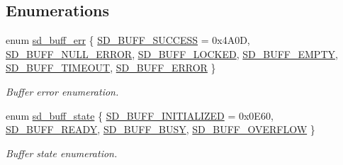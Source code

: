 \subsection*{Enumerations}
\begin{DoxyCompactItemize}
\item 
enum \mbox{\hyperlink{group___s_d___buffer___types_ga012d8a07d989f00e3f9c4a2f62743de4}{sd\+\_\+buff\+\_\+err}} \{ \newline
\mbox{\hyperlink{group___s_d___buffer___types_gga012d8a07d989f00e3f9c4a2f62743de4a57815778d30aaa889a6e73dfc081e5f6}{S\+D\+\_\+\+B\+U\+F\+F\+\_\+\+S\+U\+C\+C\+E\+SS}} = 0x4\+A0D, 
\mbox{\hyperlink{group___s_d___buffer___types_gga012d8a07d989f00e3f9c4a2f62743de4a4fbcad5e560902c4b01a8cdad1af037f}{S\+D\+\_\+\+B\+U\+F\+F\+\_\+\+N\+U\+L\+L\+\_\+\+E\+R\+R\+OR}}, 
\mbox{\hyperlink{group___s_d___buffer___types_gga012d8a07d989f00e3f9c4a2f62743de4a18c0d6717027d1d8219aa76b41bf3d4c}{S\+D\+\_\+\+B\+U\+F\+F\+\_\+\+L\+O\+C\+K\+ED}}, 
\mbox{\hyperlink{group___s_d___buffer___types_gga012d8a07d989f00e3f9c4a2f62743de4ae7df9fe6e4740934def6178fe96c6f6f}{S\+D\+\_\+\+B\+U\+F\+F\+\_\+\+E\+M\+P\+TY}}, 
\newline
\mbox{\hyperlink{group___s_d___buffer___types_gga012d8a07d989f00e3f9c4a2f62743de4ac09348ea1a8b94dcefdcae93b12717ba}{S\+D\+\_\+\+B\+U\+F\+F\+\_\+\+T\+I\+M\+E\+O\+UT}}, 
\mbox{\hyperlink{group___s_d___buffer___types_gga012d8a07d989f00e3f9c4a2f62743de4addbcfa326ec75f9c48fb2b014bd8fe42}{S\+D\+\_\+\+B\+U\+F\+F\+\_\+\+E\+R\+R\+OR}}
 \}
\begin{DoxyCompactList}\small\item\em Buffer error enumeration. \end{DoxyCompactList}\item 
enum \mbox{\hyperlink{group___s_d___buffer___types_ga52f14e9c7b7d9ba092e1cd615559012b}{sd\+\_\+buff\+\_\+state}} \{ \mbox{\hyperlink{group___s_d___buffer___types_gga52f14e9c7b7d9ba092e1cd615559012ba344018f8bba0021015065436cbeb6eda}{S\+D\+\_\+\+B\+U\+F\+F\+\_\+\+I\+N\+I\+T\+I\+A\+L\+I\+Z\+ED}} = 0x0\+E60, 
\mbox{\hyperlink{group___s_d___buffer___types_gga52f14e9c7b7d9ba092e1cd615559012ba99d36bbc57255841b60f77f1a0059c7c}{S\+D\+\_\+\+B\+U\+F\+F\+\_\+\+R\+E\+A\+DY}}, 
\mbox{\hyperlink{group___s_d___buffer___types_gga52f14e9c7b7d9ba092e1cd615559012ba7c8ca4ffdb2641e46e6b6374fb66bb83}{S\+D\+\_\+\+B\+U\+F\+F\+\_\+\+B\+U\+SY}}, 
\mbox{\hyperlink{group___s_d___buffer___types_gga52f14e9c7b7d9ba092e1cd615559012ba0b2df962b7d70e883bd5faceda09f428}{S\+D\+\_\+\+B\+U\+F\+F\+\_\+\+O\+V\+E\+R\+F\+L\+OW}}
 \}
\begin{DoxyCompactList}\small\item\em Buffer state enumeration. \end{DoxyCompactList}\end{DoxyCompactItemize}


